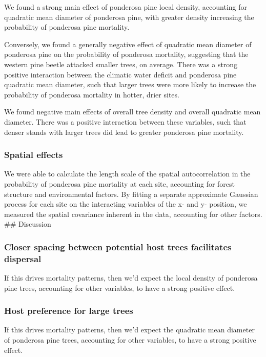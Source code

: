 \documentclass[]{article}
\begin{document}
We found a strong main effect of ponderosa pine local density,
accounting for quadratic mean diameter of ponderosa pine, with greater
density increasing the probability of ponderosa pine mortality.

Conversely, we found a generally negative effect of quadratic mean
diameter of ponderosa pine on the probability of ponderosa mortality,
suggesting that the western pine beetle attacked smaller trees, on
average. There was a strong positive interaction between the climatic
water deficit and ponderosa pine quadratic mean diameter, such that
larger trees were more likely to increase the probability of ponderosa
mortality in hotter, drier sites.

We found negative main effects of overall tree density and overall
quadratic mean diameter. There was a positive interaction between these
variables, such that denser stands with larger trees did lead to greater
ponderosa pine mortality.

\subsubsection{Spatial effects}\label{spatial-effects}

We were able to calculate the length scale of the spatial
autocorrelation in the probability of ponderosa pine mortality at each
site, accounting for forest structure and environmental factors. By
fitting a separate approximate Gaussian process for each site on the
interacting variables of the x- and y- position, we measured the spatial
covariance inherent in the data, accounting for other factors. \#\#
Discussion

\subsubsection{Closer spacing between potential host trees facilitates
dispersal}\label{closer-spacing-between-potential-host-trees-facilitates-dispersal}

If this drives mortality patterns, then we'd expect the local density of
ponderosa pine trees, accounting for other variables, to have a strong
positive effect.

\subsubsection{Host preference for large
trees}\label{host-preference-for-large-trees}

If this drives mortality patterns, then we'd expect the quadratic mean
diameter of ponderosa pine trees, accounting for other variables, to
have a strong positive effect.
\end{document}
